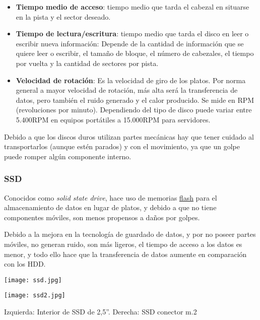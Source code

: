 \begin{itemize}
    \item \textbf{Tiempo medio de acceso}: tiempo medio que tarda el cabezal en situarse en la pista y el sector deseado.
    \item \textbf{Tiempo de lectura/escritura}: tiempo medio que tarda el disco en leer o escribir nueva información: Depende de la cantidad de información que se quiere leer o escribir, el tamaño de bloque, el número de cabezales, el tiempo por vuelta y la cantidad de sectores por pista.
    \item \textbf{Velocidad de rotación}: Es la velocidad de giro de los platos. Por norma general a mayor velocidad de rotación, más alta será la transferencia de datos, pero también el ruido generado y el calor producido. Se mide en RPM (revoluciones por minuto). Dependiendo del tipo de disco puede variar entre 5.400RPM en equipos portátiles a 15.000RPM para servidores.
\end{itemize}

Debido a que los discos duros utilizan partes mecánicas hay que tener cuidado al transportarlos (aunque estén parados) y con el movimiento, ya que un golpe puede romper algún componente interno.


\subsubsection{SSD}

Conocidos como \textit{solid state drive}, hace uso de memorias \href{https://es.wikipedia.org/wiki/Memoria_flash}{flash} para el almacenamiento de datos en lugar de platos, y debido a que no tiene componentes móviles, son menos propensos a daños por golpes.

Debido a la mejora en la tecnología de guardado de datos, y por no poseer partes móviles, no generan ruido, son más ligeros, el tiempo de acceso a los datos es menor, y todo ello hace que la transferencia de datos aumente en comparación con los HDD.

{
    \begin{minipage}{0.48\linewidth}
        \texttt{[image: ssd.jpg]}
    \end{minipage}
    \hfill
    \begin{minipage}{0.48\linewidth}
        \texttt{[image: ssd2.jpg]}
    \end{minipage}
    \vspace{-10pt}
    \begin{center}
       \footnotesize{Izquierda: Interior de SSD de 2,5”. Derecha: SSD conector m.2}
    \end{center}
}


